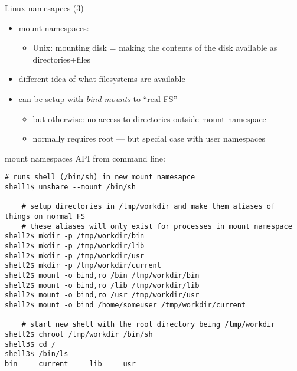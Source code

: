 \begin{frame}{Linux namesapces (3)}
    \begin{itemize}
    \item mount namespaces:
        \begin{itemize}
        \item Unix: mounting disk = making the contents of the disk available as directories+files
        \end{itemize}
    \vspace{.5cm}
    \item different idea of what filesystems are available
    \item can be setup with \textit{bind mounts} to ``real FS''
        \begin{itemize}
        \item but otherwise: no access to directories outside mount namespace
        \item normally requires root --- but special case with user namespaces
        \end{itemize}
    \end{itemize}
\end{frame}

\begin{frame}[fragile,label=mountNSCmdLine]{mount namespaces API}
from command line:
\begin{lstlisting}[language={},style=smaller]
    # runs shell (/bin/sh) in new mount namesapce
shell1$ unshare --mount /bin/sh

    # setup directories in /tmp/workdir and make them aliases of things on normal FS 
    # these aliases will only exist for processes in mount namespace
shell2$ mkdir -p /tmp/workdir/bin
shell2$ mkdir -p /tmp/workdir/lib
shell2$ mkdir -p /tmp/workdir/usr
shell2$ mkdir -p /tmp/workdir/current
shell2$ mount -o bind,ro /bin /tmp/workdir/bin
shell2$ mount -o bind,ro /lib /tmp/workdir/lib
shell2$ mount -o bind,ro /usr /tmp/workdir/usr
shell2$ mount -o bind /home/someuser /tmp/workdir/current

    # start new shell with the root directory being /tmp/workdir
shell2$ chroot /tmp/workdir /bin/sh
shell3$ cd /
shell3$ /bin/ls
bin     current     lib     usr
\end{lstlisting}
\end{frame}

